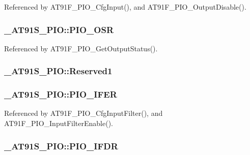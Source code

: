 Referenced by AT91F\_\-PIO\_\-CfgInput(), and AT91F\_\-PIO\_\-OutputDisable().\hypertarget{struct__AT91S__PIO_104b2e81a10a1fc02b327bf9ec570d23}{
\subsubsection{ {\bf \_\-AT91S\_\-PIO::PIO\_\-OSR}}}
\label{struct__AT91S__PIO_104b2e81a10a1fc02b327bf9ec570d23}




Referenced by AT91F\_\-PIO\_\-GetOutputStatus().\hypertarget{struct__AT91S__PIO_8d0eed279cd1fcc9d0d9d22e5f6e4d15}{
\subsubsection{ {\bf \_\-AT91S\_\-PIO::Reserved1}}}
\label{struct__AT91S__PIO_8d0eed279cd1fcc9d0d9d22e5f6e4d15}


\hypertarget{struct__AT91S__PIO_7e7a1da05d277f207aed36d54ffb9544}{
\subsubsection{ {\bf \_\-AT91S\_\-PIO::PIO\_\-IFER}}}
\label{struct__AT91S__PIO_7e7a1da05d277f207aed36d54ffb9544}




Referenced by AT91F\_\-PIO\_\-CfgInputFilter(), and AT91F\_\-PIO\_\-InputFilterEnable().\hypertarget{struct__AT91S__PIO_6158e1b4b35b79e063382033b525df3b}{
\subsubsection{ {\bf \_\-AT91S\_\-PIO::PIO\_\-IFDR}}}
\label{struct__AT91S__PIO_6158e1b4b35b79e063382033b525df3b}




